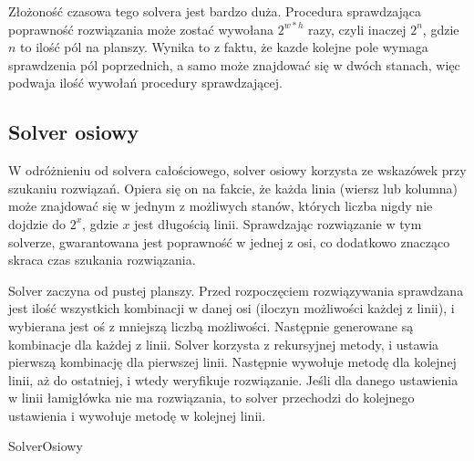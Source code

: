     Złożoność czasowa tego solvera jest bardzo duża. Procedura sprawdzająca poprawność rozwiązania
może zostać wywołana $2^{w*h}$ razy, czyli inaczej $2^n$, gdzie $n$ to ilość pól na planszy. 
Wynika to z faktu, że kazde kolejne pole wymaga sprawdzenia pól poprzednich, a samo może znajdować
się w dwóch stanach, więc podwaja ilość wywołań procedury sprawdzającej.


\subsection{Solver osiowy}
    W odróżnieniu od solvera całościowego, solver osiowy korzysta ze wskazówek przy szukaniu rozwiązań.
Opiera się on na fakcie, że każda linia (wiersz lub kolumna) może znajdować się w jednym z możliwych
stanów, których liczba nigdy nie dojdzie do $2^x$, gdzie $x$ jest długością linii. Sprawdzając
rozwiązanie w tym solverze, gwarantowana jest poprawność w jednej z osi, co dodatkowo znacząco skraca
czas szukania rozwiązania.

    Solver zaczyna od pustej planszy. Przed rozpoczęciem rozwiązywania sprawdzana jest ilość wszystkich
kombinacji w danej osi (iloczyn możliwości każdej z linii), i wybierana jest oś z mniejszą liczbą
możliwości. Następnie generowane są kombinacje dla każdej z linii. Solver korzysta z rekursyjnej
metody, i ustawia pierwszą kombinację dla pierwszej linii. Następnie wywołuje metodę dla kolejnej linii,
aż do ostatniej, i wtedy weryfikuje rozwiązanie. Jeśli dla danego ustawienia w linii łamigłówka
nie ma rozwiązania, to solver przechodzi do kolejnego ustawienia i wywołuje metodę w kolejnej linii.

\begin{pseudokod}[H]
    \caption{SolverOsiowy}\label{alg:axisSolver}
\end{pseudokod}


